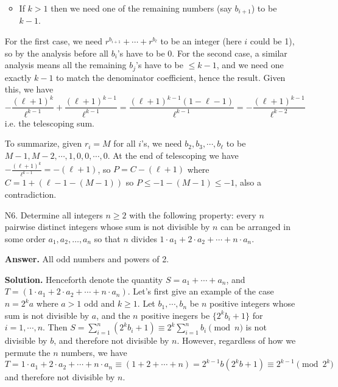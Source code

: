 \documentclass[11pt,a4paper]{article}
\begin{document}
\begin{enumerate}
\begin{itemize}
	    	\item If $k>1$ then we need one of the remaining numbers (say $b_{i+1}$) to be $k-1$. 
	    \end{itemize}
        For the first case, we need $r^{b_{i+1}}+\cdots + r^{b_{\ell}}$ to be an integer (here $i$ could be 1), 
        so by the analysis before all $b_{i}$'s have to be 0. 
        For the second case, a similar analysis means all the remaining $b_j$'s have to be $\le k-1$, 
        and we need one exactly $k-1$ to match the denominator coefficient, hence the result. 
        Given this, we have 
        \[
        -\frac{(\ell+1)^{k}}{\ell^{k-1}}
        + \frac{(\ell+1)^{k-1}}{\ell^{k-1}}
        =\frac{(\ell+1)^{k-1}(1-\ell-1)}{\ell^{k-1}}
        =-\frac{(\ell+1)^{k-1}}{\ell^{k-2}}
        \]
        i.e. the telescoping sum. 
        
        To summarize, given $r_i=M$ for all $i$'s, we need $b_2, b_3, \cdots, b_{\ell}$ to be $M-1, M-2, \cdots, 1, 0, 0, \cdots, 0$. 
        At the end of telescoping we have $-\frac{(\ell+1)^{k}}{\ell^{k-1}}=-(\ell+1)$, 
        so $P=C-(\ell+1)$ where $C=1 + (\ell-1-(M-1))$ so $P\le -1-(M-1)\le -1$, also a contradiction. 
        
        \item [N6.]
        Determine all integers $n\geqslant 2$ with the following property: every $n$ pairwise distinct integers whose sum is not divisible by $n$ can be arranged in some order $a_1,a_2,\ldots, a_n$ so that $n$ divides $1\cdot a_1+2\cdot a_2+\cdots+n\cdot a_n.$
        
        \textbf{Answer.} All odd numbers and powers of 2. 
        
        \textbf{Solution.} 
        Henceforth denote the quantity $S=a_1+\cdots + a_n$, and $T = (1\cdot a_1+2\cdot a_2+\cdots+n\cdot a_n)$. 
        Let's first give an example of the case $n = 2^ka$ where $a > 1$ odd and $k\ge 1$. 
        Let $b_1, \cdots, b_n$ be $n$ positive integers whose sum is not divisible by $a$, 
        and the $n$ positive inegers be $\{2^kb_i + 1\}$ for $i=1, \cdots, n$. 
        Then $S = \sum_{i=1}^n (2^kb_i + 1)\equiv 2^k\sum_{i=1}^n b_i\pmod{n}$ 
        is not divisible by $b$, and therefore not divisible by $n$. 
        However, regardless of how we permute the $n$ numbers, we have 
        \[
        T = 1\cdot a_1+2\cdot a_2+\cdots+n\cdot a_n
        \equiv (1 + 2 + \cdots + n)
        =2^{k-1}b(2^kb + 1)
        \equiv 2^{k-1}\pmod{2^k}
        \]
        and therefore not divisible by $n$. 
        

\end{enumerate}
\end{document}
